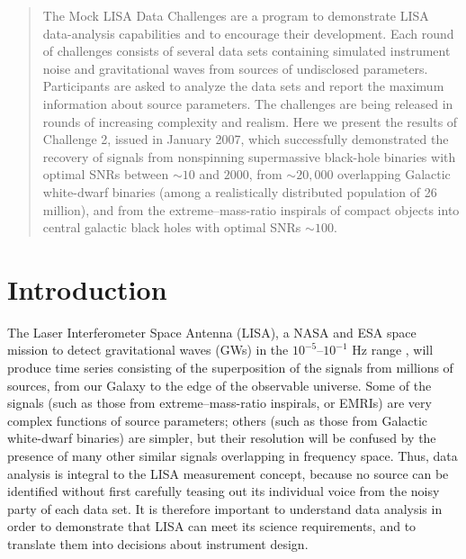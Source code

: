 \documentclass{iopart}
\begin{document}

\begin{abstract}
The Mock LISA Data Challenges are a program to demonstrate LISA data-analysis capabilities and to encourage their development. Each round of challenges consists of several data sets containing simulated instrument noise and gravitational waves from sources of undisclosed parameters. Participants are asked to analyze the data sets and report the maximum information about source parameters. The challenges are being released in rounds of increasing complexity and realism. Here we present the results of Challenge 2, issued in January 2007, which successfully demonstrated the recovery of signals from nonspinning supermassive black-hole binaries with optimal SNRs between $\sim 10$ and $2000$, from $\sim 20,000$ overlapping Galactic white-dwarf binaries (among a realistically distributed population of 26 million), and from the extreme--mass-ratio inspirals of compact objects into central galactic black holes with optimal SNRs $\sim 100$.
\end{abstract}

\vspace{-18pt}


\section{Introduction}

The Laser Interferometer Space Antenna (LISA), a NASA and ESA space mission to detect gravitational waves (GWs) in the $10^{-5}$--$10^{-1}$ Hz range \cite{lisa}, will produce time series consisting of the superposition of the signals from millions of sources, from our Galaxy to the edge of the observable universe. Some of the signals (such as those from extreme--mass-ratio inspirals, or EMRIs) are very complex functions of source parameters; others (such as those from Galactic white-dwarf binaries) are simpler, but their resolution will be confused by the presence of many other similar signals overlapping in frequency space. Thus, data analysis is integral to the LISA measurement concept, because no source can be identified without first carefully teasing out its individual voice from the noisy party of each data set. It is therefore important to understand data analysis in order to demonstrate that LISA can meet its science requirements, and to translate them into decisions about instrument design.
\end{document}
